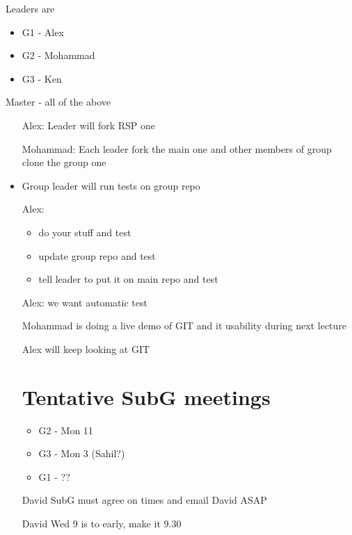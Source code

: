 \documentclass[a4paper,10pt]{article}
\begin{document}
Leaders are \begin{itemize}
             \item G1 - Alex
             \item G2 - Mohammad
             \item G3 - Ken
            \end{itemize}
            
Master - all of the above

\begin{itemize}
 \item[Alex:] Leader will fork RSP one
 \item[Mohammad:] Each leader fork the main one and other members of group clone the group one
 \item Group leader will run tests on group repo
 \item[Alex:]\begin{itemize}
              \item do your stuff and test
              \item update group repo and test
              \item tell leader to put it on main repo and test
             \end{itemize}
\item[Alex:] we want automatic test


\item[Mohammad] is doing a live demo of GIT and it usability during next lecture
\item[Alex] will keep looking at GIT

\section*{Tentative SubG meetings}
\begin{itemize}
 \item G2 - Mon 11
 \item G3 - Mon 3 (Sahil?)
 \item G1 - ??
\end{itemize}

\item[David] SubG must agree on times and email David ASAP
\item[David] Wed 9 is to early, make it 9.30


\end{itemize}








                       
\end{document}
